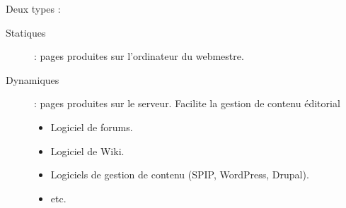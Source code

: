 \begin{frame}
	Deux types : %
	\begin{description}
		\item[Statiques] : pages produites sur l'ordinateur du webmestre.
		\item[Dynamiques] : pages produites sur le serveur. Facilite la gestion de contenu éditorial
		\begin{itemize}
			\item Logiciel de forums.
			\item Logiciel de Wiki.
			\item Logiciels de gestion de contenu (SPIP, WordPress, Drupal).
			\item etc. %
		\end{itemize} 
	\end{description}
\end{frame}
